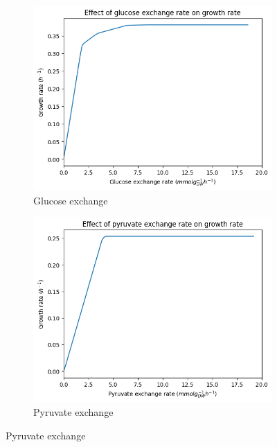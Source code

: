 \begin{figure}
  \centering
  \begin{subfigure}[htpb]{0.6\textwidth}
  \centering
    \includegraphics[width=\linewidth]{ecYeast8-glucose-saturation.png}
    \caption{Glucose exchange}
    \label{fig:model-saturation-glucose}
  \end{subfigure}

  \begin{subfigure}[htpb]{0.6\textwidth}
  \centering
    \includegraphics[width=\linewidth]{ecYeast8-pyruvate-saturation.png}
    \caption{Pyruvate exchange}
    \label{fig:model-saturation-pyruvate}
  \end{subfigure}


\end{figure}
